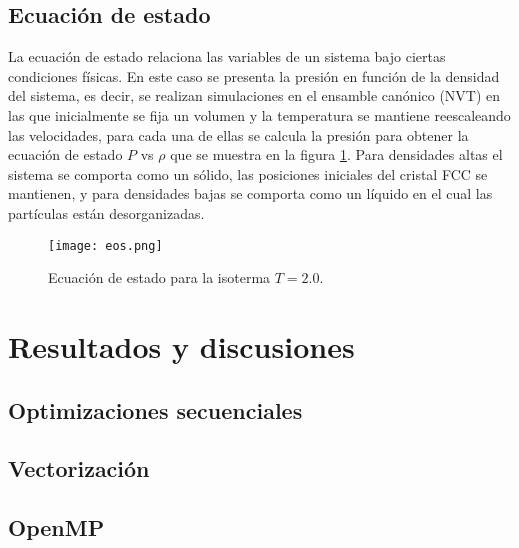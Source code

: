 \documentclass[a4paper,spanish,12pt,twoside]{article}
\begin{document}
\subsection{Ecuación de estado}

La ecuación de estado relaciona las variables de un sistema bajo ciertas condiciones físicas. En este caso se presenta la presión en función de la densidad del sistema, es decir, se realizan simulaciones en el ensamble canónico (NVT) en las que inicialmente se fija un volumen y la temperatura se mantiene reescaleando las velocidades, para cada una de ellas se calcula la presión para obtener la ecuación de estado $P$ vs $\rho$ que se muestra en la figura \ref{fig:eos}. Para densidades altas el sistema se comporta como un sólido, las posiciones iniciales del cristal FCC se mantienen, y para densidades bajas se comporta como un líquido en el cual las partículas están desorganizadas.

\begin{figure}[h]
	\centering
	\texttt{[image: eos.png]}
	\caption{Ecuación de estado para la isoterma $T=2.0$.}
	\label{fig:eos}
\end{figure}



\section{Resultados y discusiones}

\subsection{Optimizaciones secuenciales}

\subsection{Vectorización}

\subsection{OpenMP}
\end{document}
